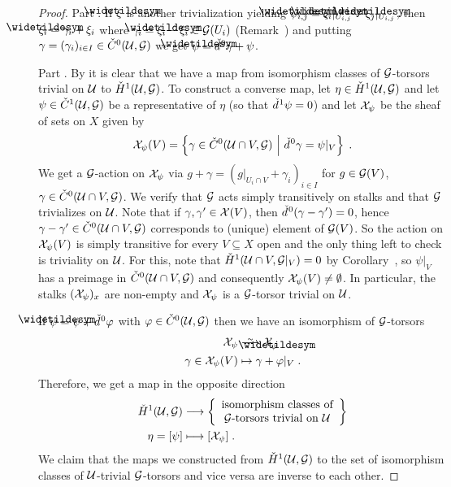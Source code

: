 \documentclass[a4paper,parskip=half,numbers=enddot, DIV=12]{scrreprt}
\begin{document}
\begin{proof}
	Part . If $\snake{\xi}$ is another trivialization yielding $\snake{\psi}_{i,j}=\snake{\xi}_i|_{U_{i,j}}-\snake{\xi}_j|_{U_{i,j}}$, then $\snake{\xi}_i=\gamma_i+\xi_i$ where $\gamma_i=\snake{\xi}_i-\xi_i\in\Gg(U_i)$ (Remark~) and putting $\gamma=(\gamma_i)_{i\in I}\in \check{C}^0(\mathcal{U},\mathcal{G})$ we get $\snake{\psi}=\hacek{d}^0\gamma+\psi$.
	
	Part . By  it is clear that we have a map from isomorphism classes of $\mathcal{G}$-torsors trivial on $\mathcal{U}$ to $\check{H}^1(\mathcal{U},\mathcal{G})$. To construct a converse map, let $\eta\in \check{H}^1(\mathcal{U},\mathcal{G})$ and let $\psi\in\check{C}^1(\mathcal{U},\mathcal{G})$ be a representative of $\eta$ (so that $\check{d}\hspace{0.06125em}^1\psi =0$) and let $\mathcal{X}_\psi$ be the sheaf of sets on $X$ given by
	\begin{align*}
		\mathcal{X}_\psi(V)=\left\{\gamma\in \check{C}^0(\mathcal{U}\cap V,\mathcal{G})\ \middle|\  \check{d}\hspace{0.06125em}^0\gamma=\psi|_V\right\}\;.
	\end{align*}
	We get a $\mathcal{G}$-action on $\mathcal{X}_\psi$ via $g+\gamma=(g|_{U_i\cap V}+\gamma_i)_{i\in I}$ for $g\in\mathcal{G}(V)$, $\gamma\in\check{C}^0(\mathcal{U}\cap V,\mathcal{G})$. We verify that $\mathcal{G}$ acts simply transitively on stalks and that $\mathcal{G}$ trivializes on $\mathcal{U}$. Note that if $\gamma,\gamma'\in \mathcal{X}(V)$, then $\check{d}\hspace{0.06125em}^0(\gamma-\gamma')=0$, hence $\gamma-\gamma'\in\check{C}^0(\mathcal{U}\cap V,\mathcal{G})$ corresponds to (unique) element of $\mathcal{G}(V)$. So the action on $\mathcal{X}_\psi(V)$ is simply transitive for every $V\subseteq X$ open and the only thing left to check is triviality on $\mathcal{U}$. For this, note that $\check{H}^1(\mathcal{U}\cap V,\mathcal{G}|_V)=0$ by Corollary~, so $\psi|_V$ has a preimage in $\check{C}^0(\mathcal{U}\cap V,\mathcal{G})$ and consequently $\mathcal{X}_\psi(V)\neq\emptyset$. In particular, the stalks $(\mathcal{X}_\psi)_x$ are non-empty and $\mathcal{X}_\psi$ is a $\mathcal{G}$-torsor trivial on $\mathcal{U}$.
	
	If $\snake{\psi}=\psi+\hacek{d}^0\phi$ with $\varphi\in\check{C}^0(\mathcal{U},\mathcal{G})$ then we have an isomorphism of $\mathcal{G}$-torsors
	\begin{align*}
		\Xx_\psi&\isomorphism\Xx_{\snake{\psi}}\\
		\gamma\in\Xx_\psi(V) &\mapsto \gamma+\phi|_V\;.
	\end{align*}
	Therefore, we get a map in the opposite direction
	\begin{align*}
		\check{H}^1(\Uu,\Gg)&\morphism\left\{\begin{array}{c}
			\text{isomorphism classes of}\\
			\Gg\text{-torsors trivial on }\Uu
		\end{array}\right\}\\
		\eta=[\psi]&\longmapsto[\Xx_\psi]\;.
	\end{align*}
	We claim that the maps we constructed from $\check{H}^1(\mathcal{U},\mathcal{G})$ to the set of isomorphism classes of $\mathcal{U}$-trivial $\mathcal{G}$-torsors and vice versa are inverse to each other. 
	

\end{proof}
\end{document}
